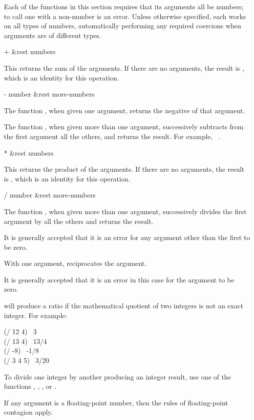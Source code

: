 Each of the functions in this section requires that its arguments all be
numbers; to call one with a non-number is an error.  Unless otherwise
specified, each works on all types of numbers, automatically performing
any required coercions when arguments are of different types.

\begin{defun}[Function]
+ &rest numbers

This returns the sum of the arguments.  If there are no arguments, the result
is , which is an identity for this operation.
\end{defun}

\begin{defun}[Function]
- number &rest more-numbers

The function \cdf{-}, when given one argument, returns the negative
of that argument.

The function \cdf{-}, when given more than one argument, successively subtracts
from the first argument all the others, and returns the result.
For example,  \EV\ .
\end{defun}

\begin{defun}[Function]
* &rest numbers

This returns the product of the arguments.
If there are no arguments, the result
is , which is an identity for this operation.
\end{defun}

\begin{defun}[Function]
/ number &rest more-numbers

The function \cdf{/}, when given more than one argument, successively divides
the first argument by all the others and returns the result.

\begin{new}%
It is generally accepted that it is an error for any argument other than the
first to be zero.
\end{new}

With one argument, \cdf{/} reciprocates the argument.

\begin{new}%
It is generally accepted that it is an error in this case for the argument
to be zero.
\end{new}

\cdf{/} will produce a ratio if the mathematical quotient of two integers
is not an exact integer.  For example:
\begin{lisp}
(/ 12 4) \EV\ 3 \\
(/ 13 4) \EV\ 13/4 \\
(/ -8) \EV\ -1/8 \\
(/ 3 4 5) \EV\ 3/20
\end{lisp}
To divide one integer by another producing an integer result,
use one of the functions , , ,
or .

If any argument is a floating-point number,
then the rules of floating-point contagion apply.
\end{defun}

